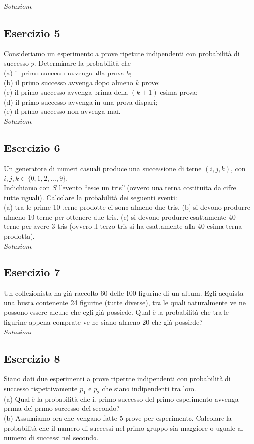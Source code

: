 \textit{Soluzione}

\subsection{Esercizio 5}
Consideriamo un esperimento a prove ripetute indipendenti con probabilità di successo $p$. Determinare la probabilità che \\
(a) il primo successo avvenga alla prova $k$; \\
(b) il primo successo avvenga dopo almeno $k$ prove; \\
(c) il primo successo avvenga prima della $(k + 1)$-esima prova; \\
(d) il primo successo avvenga in una prova dispari; \\
(e) il primo successo non avvenga mai.
\\

\textit{Soluzione}

\subsection{Esercizio 6}
Un generatore di numeri casuali produce una successione di terne $(i, j, k)$, con $i, j, k \in \{0, 1, 2, . . . , 9\}$. \\
Indichiamo con $S$ l’evento “esce un tris” (ovvero una terna costituita da cifre tutte uguali). Calcolare la probabilità dei seguenti eventi: \\

(a) tra le prime 10 terne prodotte ci sono almeno due tris. 
(b) si devono produrre almeno 10 terne per ottenere due tris. 
(c) si devono produrre esattamente 40 terne per avere 3 tris (ovvero il terzo tris si ha esattamente alla
40-esima terna prodotta).
\\

\textit{Soluzione}

\subsection{Esercizio 7}
Un collezionista ha già raccolto 60 delle 100 figurine di un album. Egli acquista una busta contenente 24 figurine (tutte diverse), tra le quali naturalmente ve ne possono essere alcune che egli già possiede. Qual è la probabilità che tra le figurine appena comprate ve ne siano almeno 20 che già possiede?
\\

\textit{Soluzione}

\subsection{Esercizio 8}
Siano dati due esperimenti a prove ripetute indipendenti con probabilità di successo rispettivamente $p_1$
e $p_2$ che siano indipendenti tra loro. \\
(a) Qual è la probabilità che il primo successo del primo esperimento avvenga prima del primo successo
del secondo? \\
(b) Assumiamo ora che vengano fatte 5 prove per esperimento. Calcolare la probabilità che il numero
di successi nel primo gruppo sia maggiore o uguale al numero di successi nel secondo.
\\

